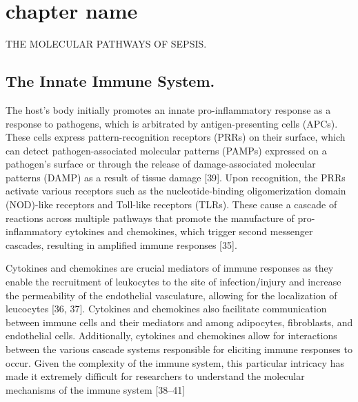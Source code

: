 
\chapter{chapter name}
{THE MOLECULAR PATHWAYS OF SEPSIS.
}\label{the-molecular-pathways-of-sepsis.}

\section{ The Innate Immune System.
}\label{the-innate-immune-system.}

The host's body initially promotes an innate pro-inflammatory response
as a response to pathogens, which is arbitrated by antigen-presenting
cells (APCs). These cells express pattern-recognition receptors (PRRs)
on their surface, which can detect pathogen-associated molecular
patterns (PAMPs) expressed on a pathogen's surface or through the
release of damage-associated molecular patterns (DAMP) as a result of
tissue damage {[}39{]}. Upon recognition, the PRRs activate various
receptors such as the nucleotide-binding oligomerization domain
(NOD)-like receptors and Toll-like receptors (TLRs). These cause a
cascade of reactions across multiple pathways that promote the
manufacture of pro-inflammatory cytokines and chemokines, which trigger
second messenger cascades, resulting in amplified immune responses
{[}35{]}.

Cytokines and chemokines are crucial mediators of immune responses as
they enable the recruitment of leukocytes to the site of
infection/injury and increase the permeability of the endothelial
vasculature, allowing for the localization of leucocytes {[}36, 37{]}.
Cytokines and chemokines also facilitate communication between immune
cells and their mediators and among adipocytes, fibroblasts, and
endothelial cells. Additionally, cytokines and chemokines allow for
interactions between the various cascade systems responsible for
eliciting immune responses to occur. Given the complexity of the immune
system, this particular intricacy has made it extremely difficult for
researchers to understand the molecular mechanisms of the immune system
{[}38--41{]}

